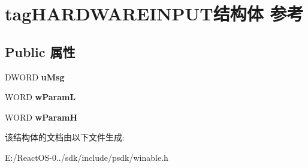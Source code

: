 \hypertarget{structtag_h_a_r_d_w_a_r_e_i_n_p_u_t}{}\section{tag\+H\+A\+R\+D\+W\+A\+R\+E\+I\+N\+P\+U\+T结构体 参考}
\label{structtag_h_a_r_d_w_a_r_e_i_n_p_u_t}
\subsection*{Public 属性}
\begin{DoxyCompactItemize}
\item 
\mbox{\label{structtag_h_a_r_d_w_a_r_e_i_n_p_u_t_abe640c02be0fa11b604e303c2b50be7e}} 
D\+W\+O\+RD {\bfseries u\+Msg}
\item 
\mbox{\label{structtag_h_a_r_d_w_a_r_e_i_n_p_u_t_afcb399690878335d63424163eed227fd}} 
W\+O\+RD {\bfseries w\+ParamL}
\item 
\mbox{\label{structtag_h_a_r_d_w_a_r_e_i_n_p_u_t_aa1b03fc6b868523bf2a84d21420e9a40}} 
W\+O\+RD {\bfseries w\+ParamH}
\end{DoxyCompactItemize}


该结构体的文档由以下文件生成\+:\begin{DoxyCompactItemize}
\item 
E\+:/\+React\+O\+S-\/0../sdk/include/psdk/winable.\+h\end{DoxyCompactItemize}
